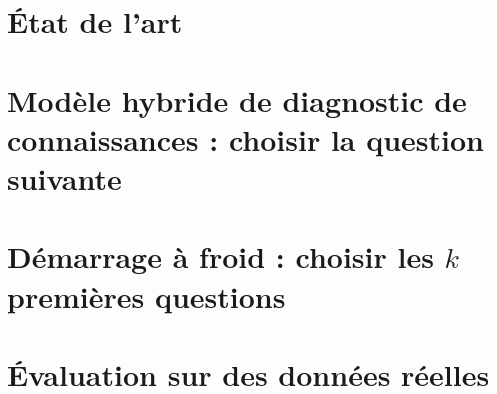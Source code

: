 \documentclass[a4paper,12pt]{book}
\begin{document}
\tableofcontents
\chapter{État de l'art}


\chapter{Modèle hybride de diagnostic de connaissances : choisir la question suivante}

\chapter{Démarrage à froid : choisir les $k$ premières questions}

\chapter{Évaluation sur des données réelles}
\end{document}
